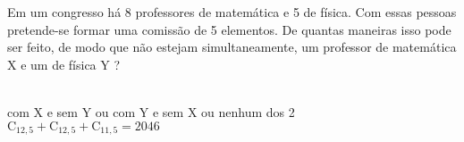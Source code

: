 \begin{ex}
 Em um congresso há 8 professores de matemática e 5 de física. Com essas pessoas pretende-se formar uma comissão de  5 elementos. De quantas maneiras isso pode ser feito, de modo que não estejam simultaneamente, um professor de matemática X e um de física Y ?
   \begin{sol}
      \phantom{A} \\
     com X e sem Y ou com Y e sem X ou nenhum dos 2\\
     $\mathrm{C}_{{12},5}+\mathrm{C}_{{12},5}+\mathrm{C}_{{11},5}=2046$
   \end{sol}
\end{ex}